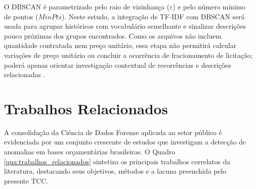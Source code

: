 \documentclass[
    12pt,               %
    openright,          %
    oneside,            %
    a4paper,            %
    chapter=TITLE,      %
    sumario=tradicional,%
    english,            %
    brazilian,          %
 ]{abntex2}
\begin{document}
O DBSCAN é parametrizado pelo raio de vizinhança ($\varepsilon$) e pelo número mínimo de pontos ($MinPts$). Neste estudo, a integração de TF-IDF com DBSCAN será usada para agrupar históricos com vocabulário semelhante e sinalizar descrições pouco próximas dos grupos encontrados. Como os arquivos não incluem quantidade contratada nem preço unitário, essa etapa não permitirá calcular variações de preço unitário ou concluir a ocorrência de fracionamento de licitação; poderá apenas orientar investigação contextual de recorrências e descrições relacionadas \cite{nunes2021}.

\section{Trabalhos Relacionados}\label{sec:trabalhos_relacionados}

A consolidação da Ciência de Dados Forense aplicada ao setor público é evidenciada por um conjunto crescente de estudos que investigam a detecção de anomalias em bases orçamentárias brasileiras. O Quadro \ref{qua:trabalhos_relacionados} sintetiza os principais trabalhos correlatos da literatura, destacando seus objetivos, métodos e a lacuna preenchida pelo presente TCC.
\end{document}
